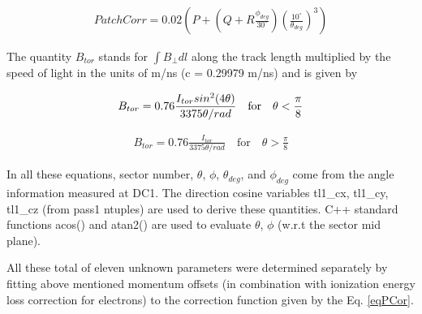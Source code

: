 \begin{eqnarray}
\label{eqPatchCor}
PatchCorr = 0.02\left(P + (Q + R\frac{\phi_{deg}}{30^\circ})(\frac{10^\circ}{\theta_{deg}})^3 \right) 
\end{eqnarray}


The quantity $B_{tor}$ stands for $\int{B_{\perp}dl}$ along the track length multiplied by the speed of light in the units 
of m/ns (c = 0.29979 m/ns) and is given by

\begin{eqnarray}
\label{eqBtor1}
B_{tor} = 0.76 \frac{I_{tor}sin^2(4\theta)}{3375\theta/rad} \quad  \rm{for} \quad  \theta < \frac{\pi}{8} %
\end{eqnarray}

\begin{eqnarray}
\label{eqBtor2}
B_{tor} = 0.76 \frac{I_{tor}}{3375\theta/rad}  \quad  \textrm{for}  \quad  \theta > \frac{\pi}{8}
\end{eqnarray}

In all these equations, sector number, $\theta$, $\phi$, $\theta_{deg}$, and $\phi_{deg}$ come from the angle information measured at DC1. The direction cosine variables tl1\_cx, tl1\_cy, tl1\_cz (from pass1 ntuples) are used to derive these quantities. C++ standard functions acos() and atan2() are used to evaluate $\theta$, $\phi$ (w.r.t the sector mid plane). %



All these total of eleven unknown parameters were determined separately by fitting above mentioned momentum offsets (in combination with ionization energy loss correction for electrons) to the correction function given by the Eq. \ref{eqPCor}.





